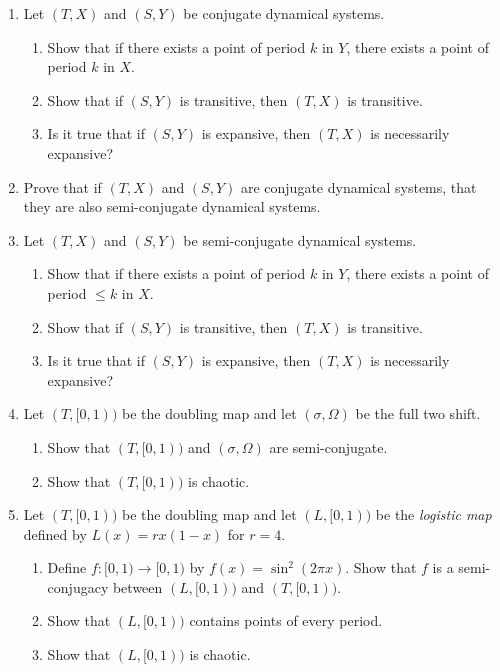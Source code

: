 \documentclass[letter]{article}
\begin{document}
\begin{enumerate}
		\begin{enumerate}
			\item Let $(T,X)$ and $(S,Y)$ be conjugate dynamical systems.
				\begin{enumerate}
					\item Show that if there exists a point of period $k$ in $Y$, there exists a point
						of period $k$ in $X$.
					\item Show that if $(S,Y)$ is transitive, then $(T,X)$ is transitive.
					\item Is it true that if $(S,Y)$ is expansive, then $(T,X)$ is necessarily expansive?
				\end{enumerate}
			\item Prove that if $(T,X)$ and $(S,Y)$ are conjugate dynamical systems, that they are also semi-conjugate dynamical
				systems.
			\item Let $(T,X)$ and $(S,Y)$ be semi-conjugate dynamical systems.
				\begin{enumerate}
					\item Show that if there exists a point of period $k$ in $Y$, there exists a point
						of period $\leq k$ in $X$.
					\item Show that if $(S,Y)$ is transitive, then $(T,X)$ is transitive.
					\item Is it true that if $(S,Y)$ is expansive, then $(T,X)$ is necessarily expansive?
				\end{enumerate}
			\item Let $(T,[0,1))$ be the doubling map and let $(\sigma, \Omega)$ be the full two shift.
				\begin{enumerate}
					\item Show that $(T,[0,1))$ and $(\sigma, \Omega)$ are semi-conjugate.
					\item Show that $(T,[0,1))$ is chaotic.
				\end{enumerate}
			\item Let $(T,[0,1))$ be the doubling map and let $(L,[0,1))$ be the \emph{logistic map} defined by
				$L(x)=rx(1-x)$ for $r=4$.
				\begin{enumerate}
					\item Define $f:[0,1)\to[0,1)$ by $f(x)=\sin^2(2\pi x)$. Show that $f$ is a semi-conjugacy
						between $(L,[0,1))$ and $(T,[0,1))$.
					\item Show that $(L,[0,1))$ contains points of every period.
					\item Show that $(L,[0,1))$ is chaotic.
				\end{enumerate}
		\end{enumerate}

	\end{enumerate}
\end{document}
